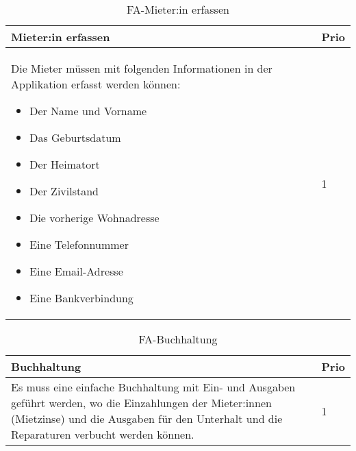\begin{table}[H]
  \centering
  \settowidth{}
  \setlength\extrarowheight{2pt}
  \begin{tabulary}{1.0\textwidth}{|m{16cm}|L|}
    \hline
    \textbf{Mieter:in erfassen}&\textbf{Prio}\\
    \hline
    Die Mieter müssen mit folgenden Informationen in der Applikation erfasst werden können:
    \begin{itemize}
      \item Der Name und Vorname
      \item Das Geburtsdatum
      \item Der Heimatort
      \item Der Zivilstand
      \item Die vorherige Wohnadresse
      \item Eine Telefonnummer
      \item Eine Email-Adresse
      \item Eine Bankverbindung
    \end{itemize} & 1\\
    \hline
  \end{tabulary}
  \caption{FA-Mieter:in erfassen}
  \label{faMieterinerfassen}
\end{table}

\begin{table}[H]
  \centering
  \settowidth{}
  \setlength\extrarowheight{2pt}
  \begin{tabulary}{1.0\textwidth}{|m{16cm}|L|}
    \hline
    \textbf{Buchhaltung}&\textbf{Prio}\\
    \hline
      Es muss eine einfache Buchhaltung mit Ein- und Ausgaben geführt werden, wo die Einzahlungen der Mieter:innen (Mietzinse) und die Ausgaben für den Unterhalt und die Reparaturen verbucht werden können.& 1\\
    \hline
  \end{tabulary}
  \caption{FA-Buchhaltung}
  \label{faBuchhaltung}
\end{table}

